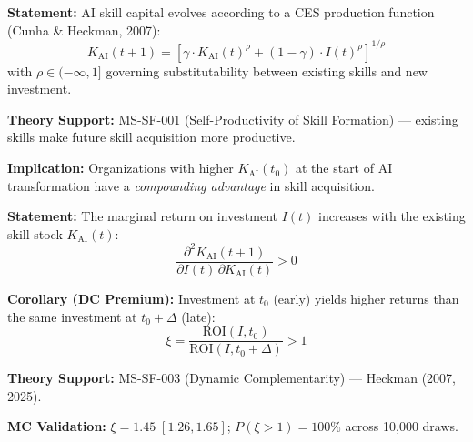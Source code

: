 \begin{tcolorbox}[colback=gray!5!white, colframe=gray!75!black,
    title=Axiom AIM-11: Skill Production Function]
\label{ax:aim-11}

\textbf{Statement:}
AI skill capital evolves according to a CES production function
(Cunha \& Heckman, 2007):
\begin{equation}
K_{\text{AI}}(t+1) = \left[\gamma \cdot K_{\text{AI}}(t)^{\rho} + (1-\gamma) \cdot I(t)^{\rho}\right]^{1/\rho}
\label{eq:aim-skill-production}
\end{equation}
with $\rho \in (-\infty, 1]$ governing substitutability between existing
skills and new investment.

\textbf{Theory Support:} MS-SF-001 (Self-Productivity of Skill Formation)
--- existing skills make future skill acquisition more productive.

\textbf{Implication:} Organizations with higher $K_{\text{AI}}(t_0)$ at
the start of AI transformation have a \emph{compounding advantage} in
skill acquisition.
\end{tcolorbox}


\begin{tcolorbox}[colback=gray!5!white, colframe=gray!75!black,
    title=Axiom AIM-12: Dynamic Complementarity]
\label{ax:aim-12}

\textbf{Statement:}
The marginal return on investment $I(t)$ increases with the existing skill
stock $K_{\text{AI}}(t)$:
\begin{equation}
\frac{\partial^2 K_{\text{AI}}(t+1)}{\partial I(t) \, \partial K_{\text{AI}}(t)} > 0
\label{eq:aim-dynamic-complementarity}
\end{equation}

\textbf{Corollary (DC Premium):} Investment at $t_0$ (early) yields higher
returns than the same investment at $t_0 + \Delta$ (late):
\begin{equation}
\xi = \frac{\text{ROI}(I, t_0)}{\text{ROI}(I, t_0 + \Delta)} > 1
\label{eq:aim-dc-premium}
\end{equation}

\textbf{Theory Support:} MS-SF-003 (Dynamic Complementarity) --- Heckman
(2007, 2025).

\textbf{MC Validation:} $\xi = 1.45 \; [1.26, 1.65]$;
$P(\xi > 1) = 100\%$ across 10,000 draws.
\end{tcolorbox}


